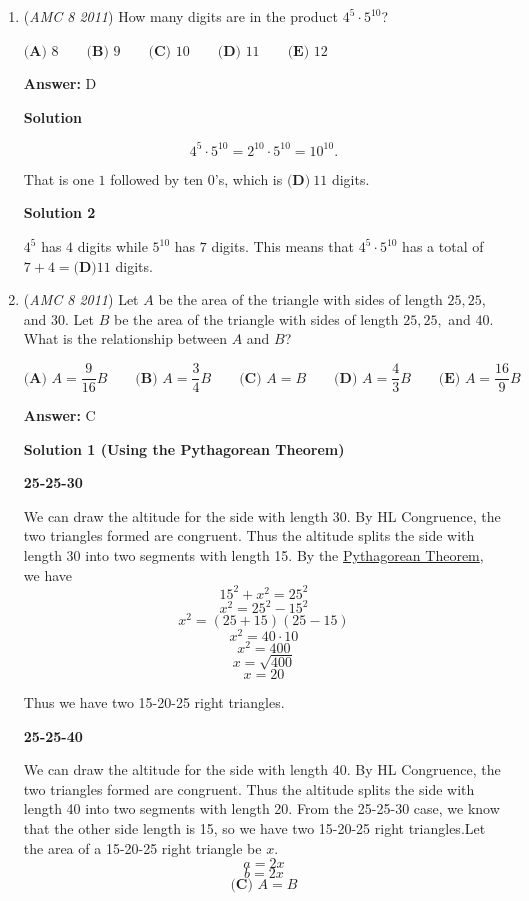 \begin{enumerate}
 


	\item (\textit{AMC 8 2011}) How many digits are in the product $4^5 \cdot 5^{10}$?


 $\textbf{(A) } 8 \qquad\textbf{(B) } 9 \qquad\textbf{(C) } 10 \qquad\textbf{(D) } 11 \qquad\textbf{(E) } 12$

 \textbf{Answer: }D



\textbf{Solution}


 \[4^5 \cdot 5^{10} = 2^{10} \cdot 5^{10} = 10^{10}.\]

 That is one $1$ followed by ten $0$'s, which is $\boxed{\textbf{(D)}\ 11}$ digits.

 



\textbf{Solution 2}

$4^5$ has $4$ digits while $5^{10}$ has $7$ digits. This means that $4^5 \cdot 5^{10}$ has a total of $7+4=\boxed{\textbf{(D)} 11}$ digits.

 


	\item (\textit{AMC 8 2011}) Let $A$ be the area of the triangle with sides of length $25, 25$, and $30$. Let $B$ be the area of the triangle with sides of length $25, 25,$ and $40$. What is the relationship between $A$ and $B$?


 $\textbf{(A) } A = \dfrac9{16}B \qquad\textbf{(B) } A = \dfrac34B \qquad\textbf{(C) } A=B \qquad\textbf{(D) } A = \dfrac43B \qquad \textbf{(E) }A = \dfrac{16}9B$

 \textbf{Answer: }C



\textbf{Solution 1 (Using the Pythagorean Theorem)}

\textbf{25-25-30}

 We can draw the altitude for the side with length 30. By HL Congruence, the two triangles formed are congruent. Thus the altitude splits the side with length 30 into two segments with length 15. By the \href{https://artofproblemsolving.com/wiki/index.php?title=Pythagorean\_Theorem}{Pythagorean Theorem}, we have 
 \[15^2 + x^2 =25^2\]
 \[x^2 = 25^2 - 15^2\]
 \[x^2 = (25 + 15)(25-15)\]
 \[x^2= 40\cdot 10\]
 \[x^2= 400\]
 \[x = \sqrt{400}\]
 \[x= 20\]

 
Thus we have two 15-20-25 right triangles.

 \textbf{25-25-40}

 We can draw the altitude for the side with length 40. By HL Congruence, the two triangles formed are congruent. Thus the altitude splits the side with length 40 into two segments with length 20. From the 25-25-30 case, we know that the other side length is 15, so we have two 15-20-25 right triangles.Let the area of a 15-20-25 right triangle be $x$.
 \[a = 2x\]
 \[b = 2x\]
 \[\boxed{\textbf{(C) } A = B}\]





\end{enumerate}
